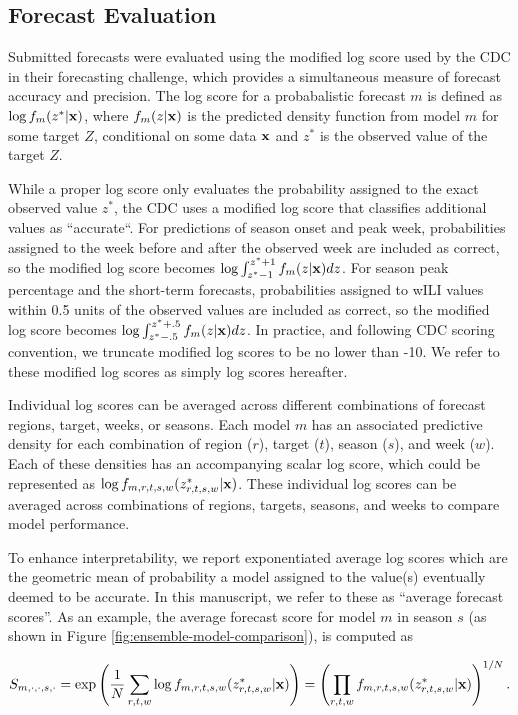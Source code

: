 \documentclass{article}\usepackage[]{graphicx}\usepackage[]{color}
\begin{document}
\subsection*{Forecast Evaluation}
Submitted forecasts were evaluated using the modified log score used by the CDC in their forecasting challenge, which provides a simultaneous measure of forecast accuracy and precision. The log score for a probabalistic forecast $m$ is defined as $\log f_m(z^*|\bf{x})$, where $f_m(z|\bf{x})$ is the predicted density function from model $m$ for some target $Z$, conditional on some data $\bf{x}$ and $z^*$ is the observed value of the target $Z$. 

While a proper log score only evaluates the probability assigned to the exact observed value $z^*$, the CDC uses a modified log score that classifies additional values as ``accurate``. For predictions of season onset and peak week, probabilities assigned to the week before and after the observed week are included as correct, so the modified log score becomes $\log \int_{z^* -1}^{z^* + 1} f_m(z|{\bf{x}})dz$. For season peak percentage and the short-term forecasts, probabilities assigned to wILI values within 0.5 units of the observed values are included as correct, so the modified log score becomes $\log \int_{z^* -.5}^{z^* + .5} f_m(z|{\bf{x}})dz$. In practice, and following CDC scoring convention, we truncate modified log scores to be no lower than -10. We refer to these modified log scores as simply log scores hereafter.

Individual log scores can be averaged across different combinations of forecast regions, target, weeks, or seasons. Each model $m$ has an associated predictive density for each combination of region ($r$), target ($t$), season ($s$), and week ($w$). Each of these densities has an accompanying scalar log score, which could be represented as $\log f_{m,r,t,s,w}(z^*_{r,t,s,w}|\bf{x})$. These individual log scores can be averaged across combinations of regions, targets, seasons, and weeks to compare model performance.

To enhance interpretability, we report exponentiated average log scores which are the geometric mean of probability a model assigned to the value(s) eventually deemed to be accurate. In this manuscript, we refer to these as ``average forecast scores''. As an example, the average forecast score for model $m$ in season $s$ (as shown in Figure \ref{fig:ensemble-model-comparison}), is computed as 

\begin{equation}
S_{m,\cdot,\cdot,s,\cdot} = \exp \left ( \frac{1}{N} \sum_{r,t,w} \log f_{m,r,t,s,w}(z^*_{r,t,s,w}|{\bf x}) \right ) 
  =  \left ( \prod_{r,t,w}  f_{m,r,t,s,w}(z^*_{r,t,s,w}|{\bf x}) \right ) ^{1/N}. 
\end{equation}
\end{document}
